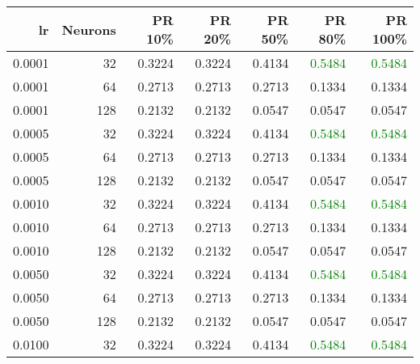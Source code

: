 \begin{tabular}{rrrrrrr}
\toprule
lr & Neurons & PR 10\% & PR 20\% & PR 50\% & PR 80\% & PR 100\% \\
\midrule
0.0001 & 32 & \textcolor{blu} {0.3224} & \textcolor{blu} {0.3224} & \textcolor{blu} {0.4134} & \textcolor{green} {0.5484} & \textcolor{green} {0.5484} \\
0.0001 & 64 & \textcolor{blu} {0.2713} & \textcolor{blu} {0.2713} & \textcolor{blu} {0.2713} & \textcolor{blu} {0.1334} & \textcolor{blu} {0.1334} \\
0.0001 & 128 & \textcolor{blu} {0.2132} & \textcolor{blu} {0.2132} & \textcolor{blu} {0.0547} & \textcolor{blu} {0.0547} & \textcolor{blu} {0.0547} \\
0.0005 & 32 & \textcolor{blu} {0.3224} & \textcolor{blu} {0.3224} & \textcolor{blu} {0.4134} & \textcolor{green} {0.5484} & \textcolor{green} {0.5484} \\
0.0005 & 64 & \textcolor{blu} {0.2713} & \textcolor{blu} {0.2713} & \textcolor{blu} {0.2713} & \textcolor{blu} {0.1334} & \textcolor{blu} {0.1334} \\
0.0005 & 128 & \textcolor{blu} {0.2132} & \textcolor{blu} {0.2132} & \textcolor{blu} {0.0547} & \textcolor{blu} {0.0547} & \textcolor{blu} {0.0547} \\
0.0010 & 32 & \textcolor{blu} {0.3224} & \textcolor{blu} {0.3224} & \textcolor{blu} {0.4134} & \textcolor{green} {0.5484} & \textcolor{green} {0.5484} \\
0.0010 & 64 & \textcolor{blu} {0.2713} & \textcolor{blu} {0.2713} & \textcolor{blu} {0.2713} & \textcolor{blu} {0.1334} & \textcolor{blu} {0.1334} \\
0.0010 & 128 & \textcolor{blu} {0.2132} & \textcolor{blu} {0.2132} & \textcolor{blu} {0.0547} & \textcolor{blu} {0.0547} & \textcolor{blu} {0.0547} \\
0.0050 & 32 & \textcolor{blu} {0.3224} & \textcolor{blu} {0.3224} & \textcolor{blu} {0.4134} & \textcolor{green} {0.5484} & \textcolor{green} {0.5484} \\
0.0050 & 64 & \textcolor{blu} {0.2713} & \textcolor{blu} {0.2713} & \textcolor{blu} {0.2713} & \textcolor{blu} {0.1334} & \textcolor{blu} {0.1334} \\
0.0050 & 128 & \textcolor{blu} {0.2132} & \textcolor{blu} {0.2132} & \textcolor{blu} {0.0547} & \textcolor{blu} {0.0547} & \textcolor{blu} {0.0547} \\
0.0100 & 32 & \textcolor{blu} {0.3224} & \textcolor{blu} {0.3224} & \textcolor{blu} {0.4134} & \textcolor{green} {0.5484} & \textcolor{green} {0.5484} \\

\end{tabular}
